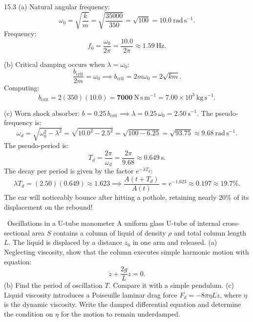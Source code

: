 \begin{solution}{15.3}
(a) Natural angular frequency:
\[
\omega_0 = \sqrt{\frac{k}{m}} = \sqrt{\frac{35000}{350}} = \sqrt{100} = \mathbf{10.0\ \mathrm{rad\,s^{-1}}.}
\]
Frequency:
\[
f_0 = \frac{\omega_0}{2\pi} = \frac{10.0}{2\pi} \approx \mathbf{1.59\ \mathrm{Hz}.}
\]

(b) Critical damping occurs when $\lambda = \omega_0$:
\[
\frac{b_{\text{crit}}}{2m} = \omega_0 \implies \boxed{b_{\text{crit}} = 2m\omega_0 = 2\sqrt{km}.}
\]
Computing:
\[
b_{\text{crit}} = 2(350)(10.0) = \mathbf{7000\ \mathrm{N\,s\,m^{-1}}} = 7.00\times 10^3\ \mathrm{kg\,s^{-1}}.
\]

(c) Worn shock absorber: $b = 0.25\,b_{\text{crit}} \implies \lambda = 0.25\,\omega_0 = 2.50\ \mathrm{s^{-1}}$.
The pseudo-frequency is:
\[
\omega_d = \sqrt{\omega_0^2 - \lambda^2} = \sqrt{10.0^2 - 2.5^2} = \sqrt{100 - 6.25} = \sqrt{93.75} \approx 9.68\ \mathrm{rad\,s^{-1}}.
\]
The pseudo-period is:
\[
T_d = \frac{2\pi}{\omega_d} = \frac{2\pi}{9.68} \approx \mathbf{0.649\ \mathrm{s}.}
\]
The decay per period is given by the factor $e^{-\lambda T_d}$:
\[
\lambda T_d = (2.50)(0.649) \approx 1.623 \implies \frac{A(t + T_d)}{A(t)} = e^{-1.623} \approx \mathbf{0.197} \approx 19.7\%.
\]
The car will noticeably bounce after hitting a pothole, retaining nearly $20\%$ of its displacement on the rebound!
\end{solution}

\begin{exercise}{\core\ Oscillations in a U-tube manometer}
A uniform glass U-tube of internal cross-sectional area $S$ contains a column of liquid of density $\rho$ and total column length $L$. The liquid is displaced by a distance $z_0$ in one arm and released.
(a) Neglecting viscosity, show that the column executes simple harmonic motion with equation:
\[
\ddot{z} + \frac{2g}{L}z = 0.
\]
(b) Find the period of oscillation $T$. Compare it with a simple pendulum.
(c) Liquid viscosity introduces a Poiseuille laminar drag force $F_d = -8\pi\eta L\dot{z}$, where $\eta$ is the dynamic viscosity. Write the damped differential equation and determine the condition on $\eta$ for the motion to remain underdamped.
\end{exercise}

\begin{tabletworkspace}[6.0cm]
\end{tabletworkspace}

